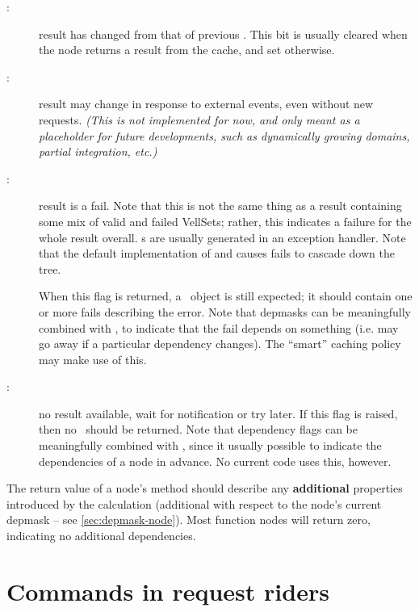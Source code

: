   \begin{description}
  
  \item[:] result has changed from that of previous \Request. This
    bit is usually cleared when the node returns a result  from the cache, and
    set otherwise.

  \item[:] result may change in response to external events,
    even without new requests. {\em (This is not implemented for now, and only meant
    as a placeholder for future developments, such as dynamically growing
    domains, partial integration, etc.)}

  \item[:] result is a fail. Note that this is not the same thing as
    a result containing some mix of valid and failed VellSets; rather, this
    indicates a failure for the whole result overall. s are usually
    generated in an exception handler. Note that the default implementation of
     and  causes fails to cascade down the
    tree.

    When this flag is returned, a \Result\ object is still expected; it should
    contain one or more fails describing the error. Note that depmasks can be
    meaningfully combined with , to indicate that the fail depends on
    something (i.e. may go away if a particular dependency changes). The
    ``smart'' caching policy may make use of this. 

  \item[:] no result available, wait for notification or try later.
    If this flag is raised, then no \Result\ should be returned. Note that
    dependency flags can be meaningfully combined with , since it
    usually possible to indicate the dependencies of a node in advance. No
    current code uses this, however.

  \end{description}
  
  The return value of a node's  method should describe any {\bf
  additional} properties introduced by the  calculation
  (additional with respect to the node's current depmask -- see
  \ref{sec:depmask-node}). Most function nodes will return zero, indicating
  no additional dependencies.

\section{Commands in request riders}
  \label{sec:rider}
  \label{sec:CSR}
  \label{sec:rider-setstate}

